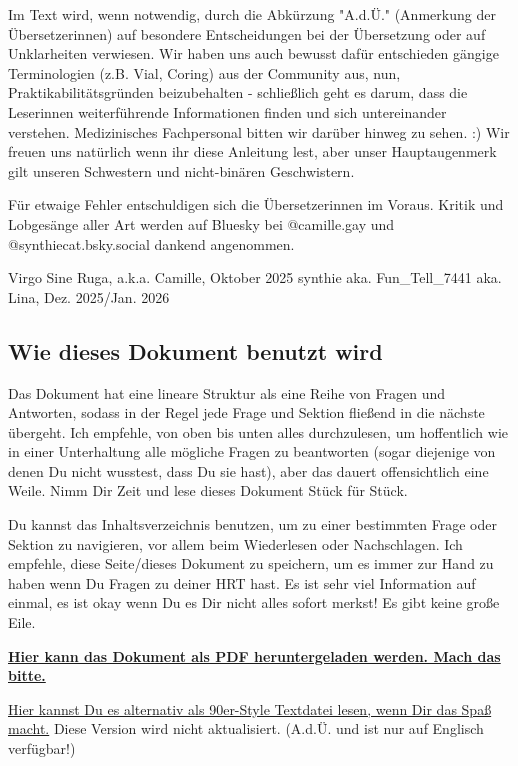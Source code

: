 \documentclass{article}
\begin{document}
Im Text wird, wenn notwendig, durch die Abkürzung "A.d.Ü." (Anmerkung der Übersetzerinnen) auf besondere Entscheidungen bei der Übersetzung oder auf Unklarheiten verwiesen. Wir haben uns auch bewusst dafür entschieden gängige Terminologien (z.B. Vial, Coring) aus der Community aus, nun, Praktikabilitätsgründen beizubehalten - schließlich geht es darum, dass die Leser\*innen weiterführende Informationen finden und sich untereinander verstehen. Medizinisches Fachpersonal bitten wir darüber hinweg zu sehen. :) Wir freuen uns natürlich wenn ihr diese Anleitung lest, aber unser Hauptaugenmerk gilt unseren Schwestern und nicht-binären Geschwistern. 

Für etwaige Fehler entschuldigen sich die Übersetzerinnen im Voraus. Kritik und Lobgesänge aller Art werden auf Bluesky bei @camille.gay und @synthiecat.bsky.social dankend angenommen.

Virgo Sine Ruga, a.k.a. Camille, Oktober 2025
synthie aka. Fun_Tell_7441 aka. Lina, Dez. 2025/Jan. 2026

																																																												  

\subsection*{Wie dieses Dokument benutzt wird}

Das Dokument hat eine lineare Struktur als eine Reihe von Fragen und Antworten, sodass in der Regel jede Frage und Sektion fließend in die nächste übergeht. Ich empfehle, von oben bis unten alles durchzulesen, um hoffentlich wie in einer Unterhaltung alle mögliche Fragen zu beantworten (sogar diejenige von denen Du nicht wusstest, dass Du sie hast), aber das dauert offensichtlich eine Weile. Nimm Dir Zeit und lese dieses Dokument Stück für Stück.

Du kannst das Inhaltsverzeichnis benutzen, um zu einer bestimmten Frage oder Sektion zu navigieren, vor allem beim Wiederlesen oder Nachschlagen. Ich empfehle, diese Seite/dieses Dokument zu speichern, um es immer zur Hand zu haben wenn Du Fragen zu deiner HRT hast. Es ist sehr viel Information auf einmal, es ist okay wenn Du es  Dir nicht alles sofort merkst! Es gibt keine große Eile. 

\noindent\textbf{\href{pghrt.pdf}{Hier kann das Dokument als PDF heruntergeladen werden. Mach das bitte.}}

\noindent\href{pghrtgretchensversion.txt}{Hier kannst Du es alternativ als 90er-Style Textdatei lesen, wenn Dir das Spaß macht.} Diese Version wird nicht aktualisiert. (A.d.Ü. und ist nur auf Englisch verfügbar!)
\end{document}
